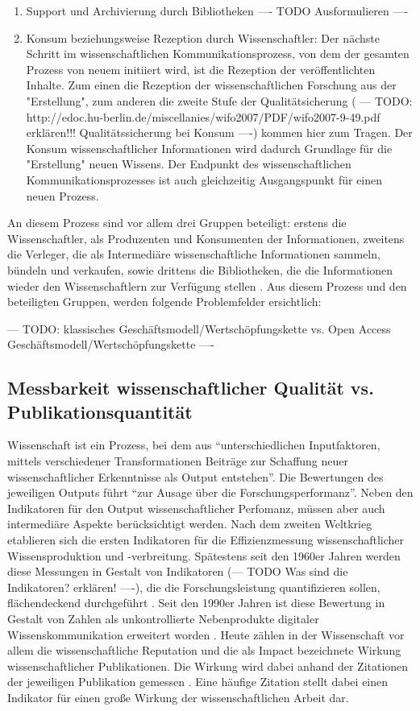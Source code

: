 \begin{enumerate}
\item Support und Archivierung durch Bibliotheken
---- TODO Ausformulieren ----
\item Konsum beziehungsweise Rezeption durch Wissenschaftler: 
Der nächste Schritt im wissenschaftlichen Kommunikationsprozess, von dem der gesamten Prozess von neuem initiiert wird, ist die Rezeption der veröffentlichten Inhalte. Zum einen die Rezeption der wissenschaftlichen Forschung aus der "Erstellung", zum anderen die zweite Stufe der Qualitätsicherung ( --- TODO: http://edoc.hu-berlin.de/miscellanies/wifo2007/PDF/wifo2007-9-49.pdf erklären!!! Qualitätssicherung bei Konsum ----) kommen hier zum Tragen.\cite{cite:11j} Der Konsum wissenschaftlicher Informationen wird dadurch Grundlage für die "Erstellung" neuen Wissens. Der Endpunkt des wissenschaftlichen Kommunikationsprozesses ist auch gleichzeitig Ausgangspunkt für einen neuen Prozess\cite{cite:11k}.
\end{enumerate}

An diesem Prozess sind vor allem drei Gruppen beteiligt: erstens die Wissenschaftler, als Produzenten und Konsumenten der Informationen, zweitens die Verleger, die als Intermediäre wissenschaftliche Informationen sammeln, bündeln und verkaufen, sowie drittens die Bibliotheken, die die Informationen wieder den Wissenschaftlern zur Verfügung stellen \cite{Odlyzko_1997}. Aus diesem Prozess und den beteiligten Gruppen, werden folgende Problemfelder ersichtlich:

--- TODO: klassisches Geschäftsmodell/Wertschöpfungskette vs. Open Access Geschäftsmodell/Wertschöpfungskette \cite{Hess_2006} ----

\subsection{Messbarkeit wissenschaftlicher Qualität vs. Publikationsquantität}
Wissenschaft ist ein Prozess, bei dem aus “unterschiedlichen Inputfaktoren, mittels verschiedener Transformationen Beiträge zur Schaffung neuer wissenschaftlicher Erkenntnisse als Output entstehen”\cite{Jansen_2007}. Die Bewertungen des jeweiligen Outputs führt “zur Ausage über die Forschungsperformanz”. Neben den Indikatoren für den Output wissenschaftlicher Perfomanz, müssen aber auch intermediäre Aspekte berücksichtigt werden\cite{schmoch_2009}. Nach dem zweiten Weltkrieg etablieren sich die ersten Indikatoren für die Effizienzmessung wissenschaftlicher Wissensproduktion und -verbreitung. Spätestens seit den 1960er Jahren werden diese Messungen in Gestalt von Indikatoren (--- TODO Was sind die Indikatoren? erklären! ----), die die Forschungsleistung quantifizieren sollen, flächendeckend durchgeführt \cite{suchen}. Seit den 1990er Jahren ist diese Bewertung in Gestalt von Zahlen als unkontrollierte Nebenprodukte digitaler Wissenskommunikation erweitert worden \cite{angermueller_2010}. Heute zählen in der Wissenschaft vor allem die wissenschaftliche Reputation und die als Impact bezeichnete Wirkung wissenschaftlicher Publikationen\cite{herb_open_2013}. Die Wirkung wird dabei anhand der Zitationen der jeweiligen Publikation gemessen \cite{suchen}. Eine häufige Zitation stellt dabei einen Indikator für einen große Wirkung der wissenschaftlichen Arbeit dar. 

